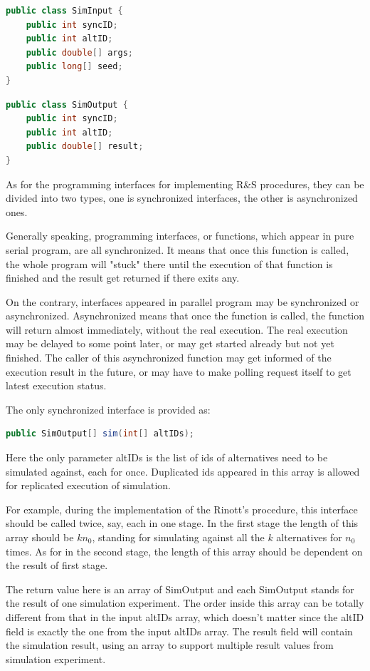 \documentclass[12pt,a4]{report}
\begin{document}
\begin{lstlisting}[language=Java]
public class SimInput {
	public int syncID;
	public int altID;
	public double[] args;
	public long[] seed;
}
\end{lstlisting}

\begin{lstlisting}[language=Java]
public class SimOutput {
	public int syncID;
	public int altID;
	public double[] result;
}
\end{lstlisting}

As for the programming interfaces for implementing R\&S procedures, they can be divided into two types, one is synchronized interfaces, the other is asynchronized ones.

Generally speaking, programming interfaces, or functions, which appear in pure serial program, are all synchronized. It means that once this function is called, the whole program will "stuck" there until the execution of that function is finished and the result get returned if there exits any.

On the contrary, interfaces appeared in parallel program may be synchronized or asynchronized. Asynchronized means that once the function is called, the function will return almost immediately, without the real execution. The real execution may be delayed to some point later, or may get started already but not yet finished. The caller of this asynchronized function may get informed of the execution result in the future, or may have to make polling request itself to get latest execution status.

The only synchronized interface is provided as:

\begin{lstlisting}[language=Java]
public SimOutput[] sim(int[] altIDs);
\end{lstlisting}

Here the only parameter altIDs is the list of ids of alternatives need to be simulated against, each for once. Duplicated ids appeared in this array is allowed for replicated execution of simulation.

For example, during the implementation of the Rinott's procedure, this interface should be called twice, say, each in one stage. In the first stage the length of this array should be $kn_0$, standing for simulating against all the $k$ alternatives for $n_0$ times. As for in the second stage, the length of this array should be dependent on the result of first stage.

The return value here is an array of SimOutput and each SimOutput stands for the result of one simulation experiment. The order inside this array can be totally different from that in the input altIDs array, which doesn't matter since the altID field is exactly the one from the input altIDs array. The result field will contain the simulation result, using an array to support multiple result values from simulation experiment.
\end{document}

